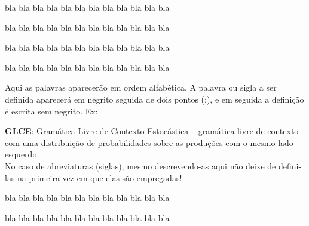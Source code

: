 \documentclass[12pt,a4paper,espaco=umemeio,noindentfirst,oneside,openany,tocpage=plain,pnumromarab,ruledheader,time,anapcustomindent]{abntex2ppgsi}
\begin{document}




\capa

\folhaderosto
\folhaderostoreverso

\folhadeaprovacao



bla bla bla bla bla bla bla bla bla bla bla bla

bla bla bla bla bla bla bla bla bla bla bla bla


bla bla bla bla bla bla bla bla bla bla bla bla

bla bla bla bla bla bla bla bla bla bla bla bla



Aqui as palavras aparecerão em ordem alfabética. A palavra ou sigla a ser definida aparecerá em negrito seguida de dois pontos (:), e em seguida a definição é escrita sem negrito. Ex:

{\bf GLCE}: Gramática Livre de Contexto Estocástica – gramática livre de contexto com uma distribuição de probabilidades sobre as produções com o mesmo lado esquerdo.\\

No caso de abreviaturas (siglas), mesmo descrevendo-as aqui não deixe de defini-las na primeira vez em que elas são empregadas!


\begin{resumo}

bla bla bla bla bla bla bla bla bla bla bla bla

bla bla bla bla bla bla bla bla bla bla bla bla

\makekeywords
\end{resumo}
\end{document}
